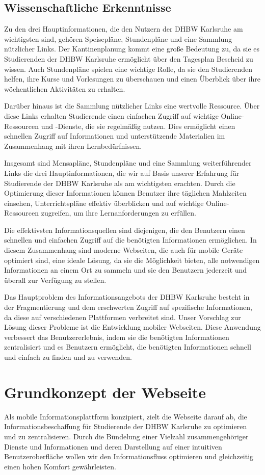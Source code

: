 \subsection{Wissenschaftliche Erkenntnisse} 
Zu den drei Hauptinformationen, die den Nutzern der DHBW Karlsruhe am wichtigsten sind, gehören Speisepläne, Stundenpläne und eine Sammlung nützlicher Links. Der Kantinenplanung kommt eine große Bedeutung zu, da sie es Studierenden der DHBW Karlsruhe ermöglicht über den Tagesplan Bescheid zu wissen. Auch Stundenpläne spielen eine wichtige Rolle, da sie den Studierenden helfen, ihre Kurse und Vorlesungen zu überschauen und einen Überblick über ihre wöchentlichen Aktivitäten zu erhalten.

Darüber hinaus ist die Sammlung nützlicher Links eine wertvolle Ressource. Über diese Links erhalten Studierende einen einfachen Zugriff auf wichtige Online-Ressourcen und -Dienste, die sie regelmäßig nutzen. Dies ermöglicht einen schnellen Zugriff auf Informationen und unterstützende Materialien im Zusammenhang mit ihren Lernbedürfnissen.
 
Insgesamt sind Mensapläne, Stundenpläne und eine Sammlung weiterführender Links die drei Hauptinformationen, die wir auf Basis unserer Erfahrung für Studierende der DHBW Karlsruhe als am wichtigsten erachten. Durch die Optimierung dieser Informationen können Benutzer ihre täglichen Mahlzeiten einsehen, Unterrichtspläne effektiv überblicken und auf wichtige Online-Ressourcen zugreifen, um ihre Lernanforderungen zu erfüllen.

Die effektivsten Informationsquellen sind diejenigen, die den Benutzern einen schnellen und einfachen Zugriff auf die benötigten Informationen ermöglichen. In diesem Zusammenhang sind moderne Webseiten, die auch für mobile Geräte optimiert sind, eine ideale Lösung, da sie die Möglichkeit bieten, alle notwendigen Informationen an einem Ort zu sammeln und sie den Benutzern jederzeit und überall zur Verfügung zu stellen.

Das Hauptproblem des Informationsangebots der DHBW Karlsruhe besteht in der Fragmentierung und dem erschwerten Zugriff auf spezifische Informationen, da diese auf verschiedenen Plattformen verbreitet sind. Unser Vorschlag zur Lösung dieser Probleme ist die Entwicklung mobiler Webseiten. Diese Anwendung verbessert das Benutzererlebnis, indem sie die benötigten Informationen zentralisiert und es Benutzern ermöglicht, die benötigten Informationen schnell und einfach zu finden und zu verwenden.

\newpage
\section{Grundkonzept der Webseite}
Als mobile Informationsplattform konzipiert, zielt die Webseite darauf ab, die Informationsbeschaffung für Studierende der DHBW Karlsruhe zu optimieren und zu zentralisieren. Durch die Bündelung einer Vielzahl zusammengehöriger Dienste und Informationen und deren Darstellung auf einer intuitiven Benutzeroberfläche wollen wir den Informationsfluss optimieren und gleichzeitig einen hohen Komfort gewährleisten.

